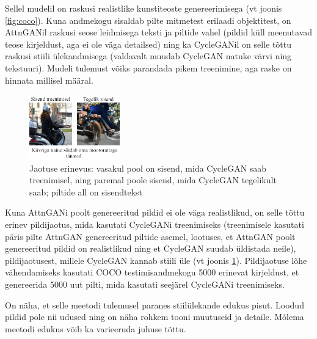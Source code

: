 \documentclass{vilgym}
\begin{document}
	Sellel mudelil on raskusi realistlike kunstiteoste genereerimisega (vt joonis \ref{fig:coco}). Kuna andmekogu sisaldab pilte mitmetest erilaadi objektitest, on AttnGANil raskusi seose leidmisega teksti ja piltide vahel (pildid küll meenutavad teose kirjeldust, aga ei ole väga detailsed) ning ka CycleGANil on selle tõttu raskusi stiili ülekandmisega (valdavalt muudab CycleGAN natuke värvi ning tekstuuri). Mudeli tulemust võiks parandada pikem treenimine, aga raske on hinnata millisel määral.

	\begin{figure}
		\includegraphics[width=0.35\textwidth]{images/distribution.png}
		\caption{Jaotuse erinevus: vasakul pool on sisend, mida CycleGAN saab treenimisel, ning paremal poole sisend, mida CycleGAN tegelikult saab; piltide all on sisendtekst}
		\label{fig:dist}
	\end{figure}

	Kuna AttnGANi poolt genereeritud pildid ei ole väga realistlikud, on selle tõttu erinev pildijaotus, mida kasutati \mbox{CycleGANi} treenimiseks (treenimisele kasutati päris pilte AttnGAN genereeritud piltide asemel, lootuses, et AttnGAN poolt genereeritud pildid on realistlikud ning et CycleGAN suudab üldistada neile), pildijaotusest, millele CycleGAN kannab stiili üle (vt joonis \ref{fig:dist}). Pildijaotuse lõhe vähendamiseks kasutati COCO testimisandmekogu 5000 erinevat kirjeldust, et genereerida 5000 uut pilti, mida kasutati seejärel CycleGANi treenimiseks.

	On näha, et selle meetodi tulemusel paranes stiilülekande edukus pisut. Loodud pildid pole nii udused ning on näha rohkem tooni muutuseid ja detaile. Mõlema meetodi edukus võib ka varieeruda juhuse tõttu.
\end{document}
